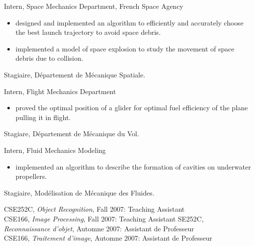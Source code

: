 \documentclass{article}
\begin{document}
\begin{llist}
{
Intern, Space Mechanics Department, French Space Agency
\vspace{-0.33cm}
\begin{itemize}
 \item designed and implemented an algorithm to efficiently and accurately choose the best launch trajectory 
to avoid space debris.
 \item implemented a model of space explosion to study the movement of space debris due to collision.
\end{itemize}
}
{
Stagiaire, D\'{e}partement de M\'{e}canique Spatiale.
}

 
{
Intern, Flight Mechanics Department
\vspace{-0.33cm}
\begin{itemize}
 \item proved the optimal position of a glider for optimal fuel efficiency of the plane pulling it in flight.
\end{itemize}
}
{
Stagiare, D\'{e}partement de M\'{e}canique du Vol.
}

 
{
Intern, Fluid Mechanics Modeling
\vspace{-0.33cm}
\begin{itemize}
 \item implemented an algorithm to describe the formation of cavities on underwater propellers.
\end{itemize}
}
{
Stagiaire, Mod\'{e}lisation de M\'{e}canique des Fluides.
}

{
}
{
}
{
CSE252C, {\em Object Recognition}, Fall 2007: Teaching Assistant\\
CSE166, {\em Image Processing}, Fall 2007: Teaching Assistant
}
{
SE252C, {\em Reconnaissance d'objet}, Automne 2007: Assistant de Professeur\\
CSE166, {\em Traitement d'image}, Automne 2007: Assistant de Professeur
}

\newpage
{}
{
\vspace{-0.4cm}

}
\end{llist}
\end{document}
